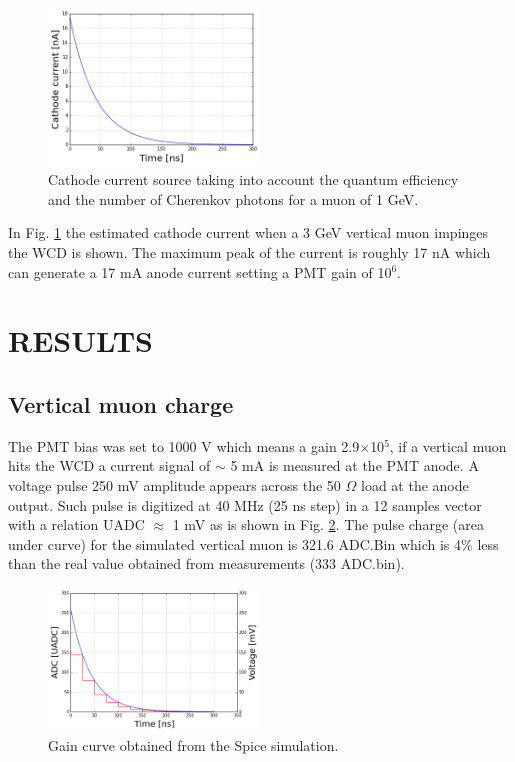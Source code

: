 \documentclass[letterpaper, 10 pt, conference]{ieeeconf}  %
\begin{document}
\begin{figure}[h!]
\begin{center}
\includegraphics[width=0.5\textwidth]{Figures/Cathode_current}
\caption{Cathode current source taking into account the quantum efficiency and the number of Cherenkov photons for a muon of 1 GeV.}
\label{cathode}
\end{center}
\end{figure}

In Fig. \ref{cathode} the estimated cathode current when a 3 GeV vertical muon impinges the WCD is shown. The maximum peak of the current is roughly 17 nA which can generate a 17 mA anode current setting a PMT gain of 10$^6$.

\section{RESULTS}

\subsection{Vertical muon charge}

The PMT bias was set to 1000 V which means a gain 2.9$\times$10$^5$, if a vertical muon hits the WCD a current signal of $\sim$ 5 mA is measured at the PMT anode. A voltage pulse 250 mV amplitude appears across the 50 $\Omega$ load at the anode output. Such pulse is digitized at 40 MHz (25 ns step) in a 12 samples vector with a relation UADC $\approx$ 1 mV as is shown in Fig. \ref{digitized}. The pulse charge (area under curve) for the simulated vertical muon is 321.6 ADC.Bin which is 4$\%$ less than the real value obtained from measurements (333 ADC.bin).


\begin{figure}[h!]
\begin{center}
\includegraphics[width=0.5\textwidth]{Figures/dig_pulse.png}
\caption{Gain curve obtained from the Spice simulation.}
\label{digitized}
\end{center}
\end{figure}
\end{document}
